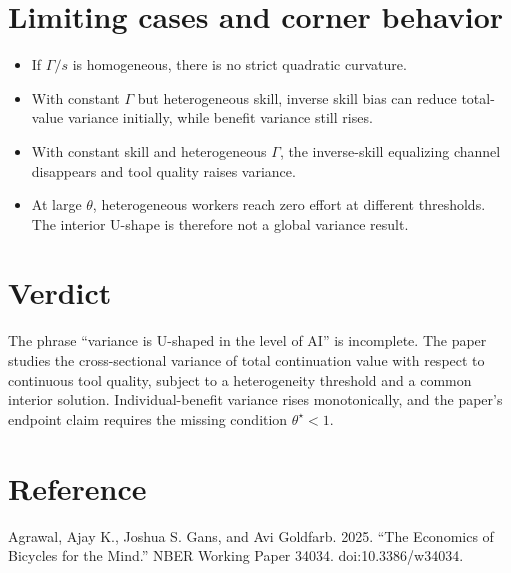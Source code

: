 \documentclass[11pt]{article}
\begin{document}
\section{Limiting cases and corner behavior}

\begin{itemize}
  \item If $\Gamma/s$ is homogeneous, there is no strict quadratic curvature.
  \item With constant $\Gamma$ but heterogeneous skill, inverse skill bias can
    reduce total-value variance initially, while benefit variance still rises.
  \item With constant skill and heterogeneous $\Gamma$, the inverse-skill
    equalizing channel disappears and tool quality raises variance.
  \item At large $\theta$, heterogeneous workers reach zero effort at different
    thresholds. The interior U-shape is therefore not a global variance result.
\end{itemize}

\clearpage
\section*{Verdict}

The phrase ``variance is U-shaped in the level of AI'' is incomplete. The
paper studies the cross-sectional variance of total continuation value with
respect to continuous tool quality, subject to a heterogeneity threshold and a
common interior solution. Individual-benefit variance rises monotonically, and
the paper's endpoint claim requires the missing condition
$\theta^\star<1$.

\section*{Reference}

Agrawal, Ajay K., Joshua S. Gans, and Avi Goldfarb. 2025. ``The Economics of
Bicycles for the Mind.'' NBER Working Paper 34034.
doi:10.3386/w34034.
\end{document}
